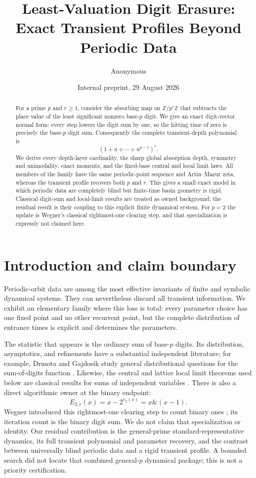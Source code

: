 \documentclass[11pt,a4paper]{amsart}
\title[Least-valuation digit erasure]{Least-Valuation Digit Erasure:\\
Exact Transient Profiles Beyond Periodic Data}
\author{Anonymous}
\date{Internal preprint, 29 August 2026}
\theoremstyle{definition}
\theoremstyle{remark}
\newcommand{\Z}{\mathbb Z}
\begin{document}
\begin{abstract}
For a prime $p$ and $r\geq1$, consider the absorbing map on
$\Z/p^r\Z$ that subtracts the place value of the least significant nonzero
base-$p$ digit.  We give an exact digit-vector normal form: every step lowers
the digit sum by one, so the hitting time of zero is precisely the base-$p$
digit sum.  Consequently the complete transient-depth polynomial is
\[
 (1+u+\cdots+u^{p-1})^r.
\]
We derive every depth-layer cardinality, the sharp global absorption depth,
symmetry and unimodality, exact moments, and the fixed-base central and local
limit laws.  All members of the family have the same periodic-point sequence
and Artin--Mazur zeta, whereas the transient profile recovers both $p$ and
$r$.  This gives a small exact model in which periodic data are completely
blind but finite-time basin geometry is rigid.  Classical digit-sum and
local-limit results are treated as owned background; the residual result is
their coupling to this explicit finite dynamical system.
For $p=2$ the update is Wegner's classical rightmost-one clearing step, and
that specialization is expressly not claimed here.
\end{abstract}

\maketitle

\section{Introduction and claim boundary}

Periodic-orbit data are among the most effective invariants of finite and
symbolic dynamical systems.  They can nevertheless discard all transient
information.  We exhibit an elementary family where this loss is total:
every parameter choice has one fixed point and no other recurrent point, but
the complete distribution of entrance times is explicit and determines the
parameters.

The statistic that appears is the ordinary sum of base-$p$ digits.  Its
distribution, asymptotics, and refinements have a substantial independent
literature; for example, Drmota and Gajdosik study general distributional
questions for the sum-of-digits function \cite{DrmotaGajdosik1998}.
Likewise, the central and lattice local limit theorems used below are
classical results for sums of independent variables \cite{Petrov1975}.
There is also a direct algorithmic owner at the binary endpoint:
\[
 E_{2,r}(x)=x-2^{v_2(x)}=x\mathbin{\&}(x-1).
\]
Wegner introduced this rightmost-one clearing step to count binary ones
\cite{Wegner1960}; its iteration count is the binary digit sum.  We do not
claim that specialization or identity.  Our residual contribution is the
general-prime standard-representative dynamics, its full transient
polynomial and parameter recovery, and the contrast between universally
blind periodic data and a rigid transient profile.  A bounded search did
not locate that combined general-$p$ dynamical package; this is not a
priority certification.
\end{document}
